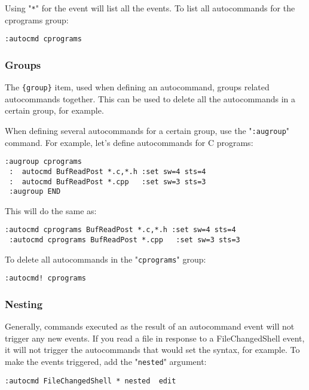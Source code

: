 Using "\texttt{*}" for the event will list all the events.
To list all autocommands for the cprograms group:

\begin{Verbatim}[samepage=true]
 :autocmd cprograms
\end{Verbatim}

\subsubsection{Groups}
The \texttt{\{group\}} item, used when defining an autocommand, groups related autocommands together.
This can be used to delete all the autocommands in a certain group, for example.

When defining several autocommands for a certain group, use the "\texttt{:augroup}" command.
For example, let's define autocommands for C programs:

\begin{Verbatim}[samepage=true]
 :augroup cprograms
 :  autocmd BufReadPost *.c,*.h :set sw=4 sts=4
 :  autocmd BufReadPost *.cpp   :set sw=3 sts=3
 :augroup END
\end{Verbatim}

This will do the same as:

\begin{Verbatim}[samepage=true]
 :autocmd cprograms BufReadPost *.c,*.h :set sw=4 sts=4
 :autocmd cprograms BufReadPost *.cpp   :set sw=3 sts=3
\end{Verbatim}

To delete all autocommands in the "\texttt{cprograms}" group:

\begin{Verbatim}[samepage=true]
 :autocmd! cprograms
\end{Verbatim}

\subsubsection{Nesting}
Generally, commands executed as the result of an autocommand event will not trigger any new events.
If you read a file in response to a FileChangedShell event, it will not trigger the autocommands that would set the syntax, for example.
To make the events triggered, add the "\texttt{nested}" argument:

\begin{Verbatim}[samepage=true]
 :autocmd FileChangedShell * nested  edit
\end{Verbatim}

